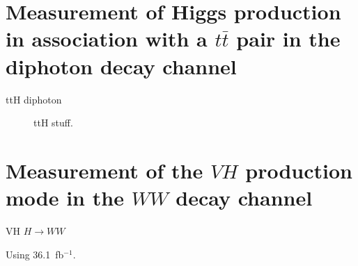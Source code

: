 \documentclass{moriond}
\begin{document}
\section{Measurement of Higgs production in association with a $t\bar t$ pair in the diphoton decay channel}\label{sec:ttH_yy}

ttH diphoton \cite{ATLAS-CONF-2019-004}

\begin{figure}[!htbp]
  \centering
  \caption{
    ttH stuff.
  }
  \label{fig:vh_bb}
\end{figure}

\section{Measurement of the $VH$ production mode in the $WW$ decay channel} \label{sec:vh_ww}

VH $H{\rightarrow}WW$ \cite{HIGG-2017-14}

Using 36.1~fb$^{-1}$.
\end{document}
